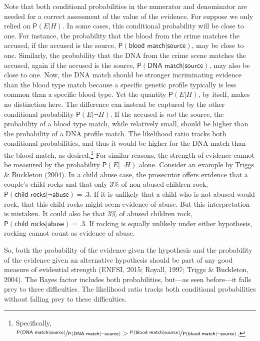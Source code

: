 \documentclass[
  10pt,
  dvipsnames,enabledeprecatedfontcommands]{scrartcl}
\newcommand{\pr}[1]{\mathsf{P}(#1)}
\begin{document}
Note that both conditional probabilities in the numerator and
denominator are needed for a correct assessment of the value of the
evidence. For suppose we only relied on \(\pr{E \vert H}\). In some
cases, this conditional probability will be close to one. For instance,
the probability that the blood from the crime matches the accused, if
the accused is the source,
\(\pr{\textsf{blood match} \vert \textsf{source}}\), may be close to
one. Similarly, the probability that the DNA from the crime scene
matches the accused, again if the accused is the source,
\(\pr{\textsf{DNA match} \vert \textsf{source}}\), may also be close to
one. Now, the DNA match should be stronger incriminating evidence than
the blood type match because a specific genetic profile typically is
less common than a specific blood type. Yet the quantity
\(\pr{E \vert H}\), by itself, makes no distinction here. The difference
can instead be captured by the other conditional probability
\(\pr{E \vert \neg H}\). If the accused is \textit{not} the source, the
probability of a blood type match, while relatively small, should be
higher than the probability of a DNA profile match. The likelihood ratio
tracks both conditional probabilities, and thus it would be higher for
the DNA match than the blood match, as desired.\footnote{Specifically,
  \(\nicefrac{\pr{\textsf{DNA match} \vert \textsf{source}}}{\pr{\textsf{DNA match} \vert \neg \textsf{source}}} > \nicefrac{\pr{\textsf{blood match} \vert \textsf{source}}}{\pr{\textsf{blood match} \vert \neg \textsf{source}}}\).}
For similar reasons, the strength of evidence cannot be measured by the
probability \(\pr{E \vert \neg H}\) alone. Consider an example by Triggs
\& Buckleton (2004). In a child abuse case, the prosecutor offers
\label{text:rock} evidence that a couple's child rocks and that only 3\%
of non-abused children rock,
\(\pr{\textsf{child rocks} \vert \neg \textsf{abuse}}=.3\). If it is
unlikely that a child who is not abused would rock, that this child
rocks might seem evidence of abuse. But this interpretation is mistaken.
It could also be that 3\% of abused children rock,
\(\pr{\textsf{child rocks} \vert \textsf{abuse}}=.3\). If rocking is
equally unlikely under either hypothesis, rocking cannot count as
evidence of abuse.

So, both the probability of the evidence given the hypothesis and the
probability of the evidence given an alternative hypothesis should be
part of any good measure of evidential strength (ENFSI, 2015; Royall,
1997; Triggs \& Buckleton, 2004). The Bayes factor includes both
probabilities, but---as seen before---it falls prey to three
difficulties. The likelihood ratio tracks both conditional probabilities
without falling prey to these difficulties.
\end{document}
